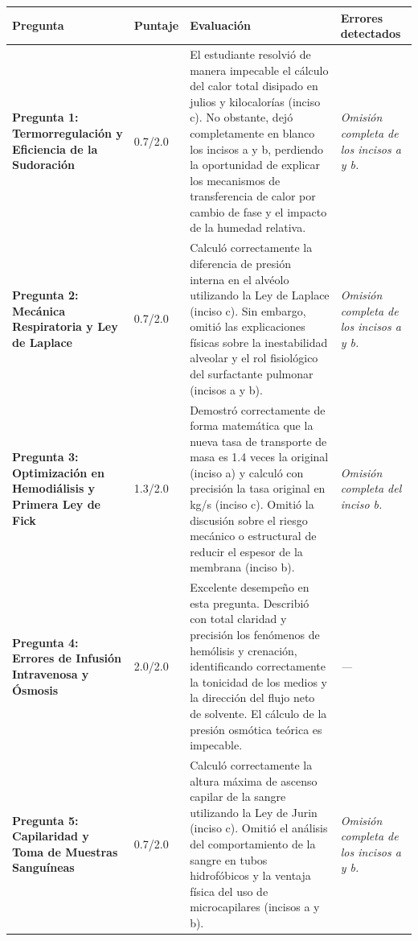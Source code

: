 \documentclass[11pt,a4paper]{article}
\begin{document}
\begin{longtable}{>{\bfseries}p{2.8cm} p{1.6cm} p{7.0cm} p{2.8cm}}
  \toprule
  \textbf{Pregunta} & \textbf{Puntaje} & \textbf{Evaluación} & \textbf{Errores detectados} \\
  \midrule
  \endhead
  \bottomrule
  \endfoot
    \textbf{Pregunta 1: Termorregulación y Eficiencia de la Sudoración} & 0.7/2.0 & El estudiante resolvió de manera impecable el cálculo del calor total disipado en julios y kilocalorías (inciso c). No obstante, dejó completamente en blanco los incisos a y b, perdiendo la oportunidad de explicar los mecanismos de transferencia de calor por cambio de fase y el impacto de la humedad relativa. & \textit{Omisión completa de los incisos a y b.} \\
    \midrule
    \textbf{Pregunta 2: Mecánica Respiratoria y Ley de Laplace} & 0.7/2.0 & Calculó correctamente la diferencia de presión interna en el alvéolo utilizando la Ley de Laplace (inciso c). Sin embargo, omitió las explicaciones físicas sobre la inestabilidad alveolar y el rol fisiológico del surfactante pulmonar (incisos a y b). & \textit{Omisión completa de los incisos a y b.} \\
    \midrule
    \textbf{Pregunta 3: Optimización en Hemodiálisis y Primera Ley de Fick} & 1.3/2.0 & Demostró correctamente de forma matemática que la nueva tasa de transporte de masa es 1.4 veces la original (inciso a) y calculó con precisión la tasa original en kg/s (inciso c). Omitió la discusión sobre el riesgo mecánico o estructural de reducir el espesor de la membrana (inciso b). & \textit{Omisión completa del inciso b.} \\
    \midrule
    \textbf{Pregunta 4: Errores de Infusión Intravenosa y Ósmosis} & 2.0/2.0 & Excelente desempeño en esta pregunta. Describió con total claridad y precisión los fenómenos de hemólisis y crenación, identificando correctamente la tonicidad de los medios y la dirección del flujo neto de solvente. El cálculo de la presión osmótica teórica es impecable. & \textit{---} \\
    \midrule
    \textbf{Pregunta 5: Capilaridad y Toma de Muestras Sanguíneas} & 0.7/2.0 & Calculó correctamente la altura máxima de ascenso capilar de la sangre utilizando la Ley de Jurin (inciso c). Omitió el análisis del comportamiento de la sangre en tubos hidrofóbicos y la ventaja física del uso de microcapilares (incisos a y b). & \textit{Omisión completa de los incisos a y b.} \\
    \midrule
\end{longtable}
\end{document}
